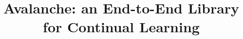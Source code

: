 \documentclass[final]{cvpr}
\theoremstyle{definition}
\begin{document}
\title{Avalanche: an End-to-End Library for Continual Learning}

\end{document}
